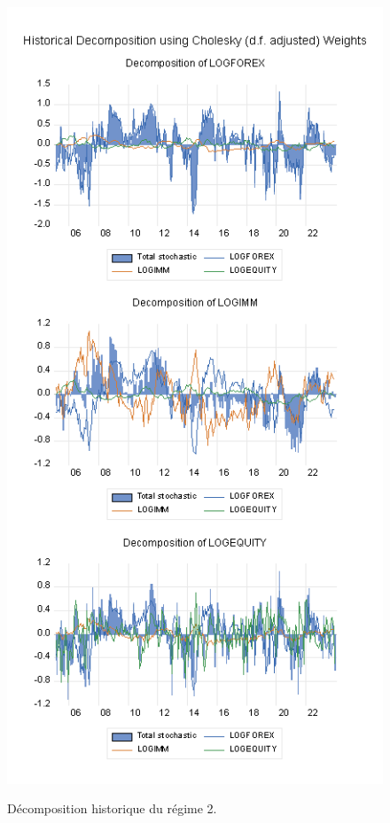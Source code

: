 \begin{figure}[H]
    \centering
    \caption{Décomposition historique du régime 2.}
    \includegraphics[scale=1]{annexes/regime_1_historcal_decomposition.png}
    \label{fig:msih_resids}
\end{figure}

